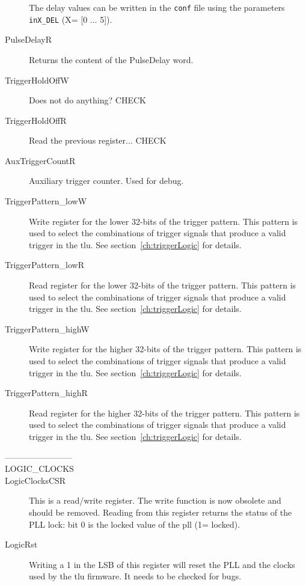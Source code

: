 \begin{description}
      The delay values can be written in the \verb|conf| file using the parameters \verb|inX_DEL| (X= [0 ... 5]).\\
  \item[PulseDelayR] Returns the content of the PulseDelay word.
  \item[TriggerHoldOffW] Does not do anything? \textcolor[rgb]{1.00,0.00,0.00}{CHECK}
  \item[TriggerHoldOffR] Read the previous register... \textcolor[rgb]{1.00,0.00,0.00}{CHECK}
  \item[AuxTriggerCountR] Auxiliary trigger counter. Used for debug.
  \item[TriggerPattern\_lowW] Write register for the lower 32-bits of the trigger pattern. This pattern is used to select the combinations of trigger signals that produce a valid trigger in the \gls{tlu}. See section~\ref{ch:triggerLogic} for details.
  \item[TriggerPattern\_lowR] Read register for the lower 32-bits of the trigger pattern. This pattern is used to select the combinations of trigger signals that produce a valid trigger in the \gls{tlu}. See section~\ref{ch:triggerLogic} for details.
  \item[TriggerPattern\_highW] Write register for the higher 32-bits of the trigger pattern. This pattern is used to select the combinations of trigger signals that produce a valid trigger in the \gls{tlu}. See section~\ref{ch:triggerLogic} for details.
  \item[TriggerPattern\_highR] Read register for the higher 32-bits of the trigger pattern. This pattern is used to select the combinations of trigger signals that produce a valid trigger in the \gls{tlu}. See section~\ref{ch:triggerLogic} for details.
\end{description}

\begin{description}
  \item[------------------------]
  \item[LOGIC\_CLOCKS]
  \item[LogicClocksCSR] This is a read/write register. The write function is now obsolete and should be removed. Reading from this register returns the status of the PLL lock: bit 0 is the locked value of the pll (1= locked).
  \item[LogicRst] Writing a 1 in the LSB of this register will reset the PLL and the clocks used by the \gls{tlu} firmware. It needs to be checked for bugs.
\end{description}

